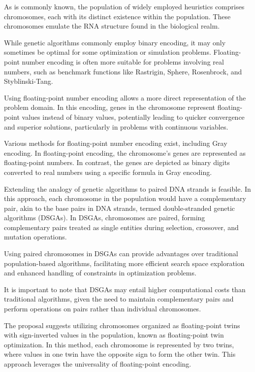 \documentclass[runningheads]{llncs}
\begin{document}
As is commonly known, the population of widely employed heuristics comprises chromosomes, each with its distinct existence within the population. These chromosomes emulate the RNA structure found in the biological realm.

While genetic algorithms commonly employ binary encoding, it may only sometimes be optimal for some optimization or simulation problems. Floating-point number encoding is often more suitable for problems involving real numbers, such as benchmark functions like Rastrigin, Sphere, Rosenbrock, and Styblinski-Tang\cite{Jamil-2013}.

Using floating-point number encoding allows a more direct representation of the problem domain. In this encoding, genes in the chromosome represent floating-point values instead of binary values, potentially leading to quicker convergence and superior solutions, particularly in problems with continuous variables.

Various methods for floating-point number encoding exist, including Gray encoding. In floating-point encoding, the chromosome's genes are represented as floating-point numbers. In contrast, the genes are depicted as binary digits converted to real numbers using a specific formula in Gray encoding.

Extending the analogy of genetic algorithms to paired DNA strands is feasible. In this approach, each chromosome in the population would have a complementary pair, akin to the base pairs in DNA strands, termed double-stranded genetic algorithms (DSGAs)\cite{Zang-2019}. In DSGAs, chromosomes are paired, forming complementary pairs treated as single entities during selection, crossover, and mutation operations.

Using paired chromosomes in DSGAs can provide advantages over traditional population-based algorithms, facilitating more efficient search space exploration and enhanced handling of constraints in optimization problems.

It is important to note that DSGAs may entail higher computational costs than traditional algorithms, given the need to maintain complementary pairs and perform operations on pairs rather than individual chromosomes.

The proposal suggests utilizing chromosomes organized as floating-point twins with sign-inverted values in the population, known as floating-point twin optimization. In this method, each chromosome is represented by two twins\cite{Yang-2003}, where values in one twin have the opposite sign to form the other twin. This approach leverages the universality of floating-point encoding.
\end{document}
